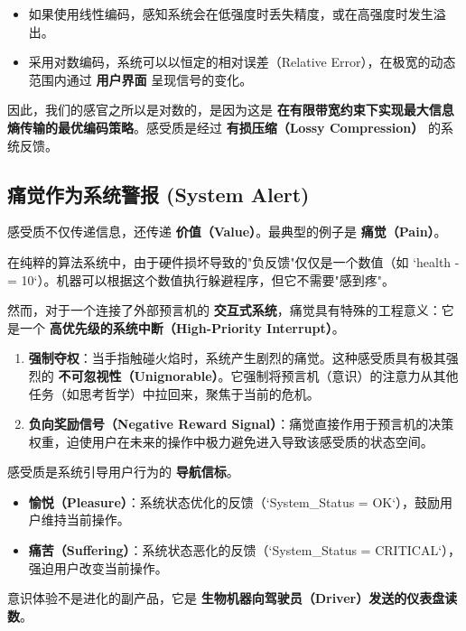 \begin{itemize}
\item 如果使用线性编码，感知系统会在低强度时丢失精度，或在高强度时发生溢出。

\item 采用对数编码，系统可以以恒定的相对误差（Relative Error），在极宽的动态范围内通过 \textbf{用户界面} 呈现信号的变化。
\end{itemize}

因此，我们的感官之所以是对数的，是因为这是 \textbf{在有限带宽约束下实现最大信息熵传输的最优编码策略}。感受质是经过 \textbf{有损压缩（Lossy Compression）} 的系统反馈。

\subsection{痛觉作为系统警报 (System Alert)}

感受质不仅传递信息，还传递 \textbf{价值（Value）}。最典型的例子是 \textbf{痛觉（Pain）}。

在纯粹的算法系统中，由于硬件损坏导致的"负反馈"仅仅是一个数值（如 `health -= 10`）。机器可以根据这个数值执行躲避程序，但它不需要"感到疼"。

然而，对于一个连接了外部预言机的 \textbf{交互式系统}，痛觉具有特殊的工程意义：它是一个 \textbf{高优先级的系统中断（High-Priority Interrupt）}。

\begin{enumerate}
\item \textbf{强制夺权}：当手指触碰火焰时，系统产生剧烈的痛觉。这种感受质具有极其强烈的 \textbf{不可忽视性（Unignorable）}。它强制将预言机（意识）的注意力从其他任务（如思考哲学）中拉回来，聚焦于当前的危机。

\item \textbf{负向奖励信号（Negative Reward Signal）}：痛觉直接作用于预言机的决策权重，迫使用户在未来的操作中极力避免进入导致该感受质的状态空间。
\end{enumerate}

\begin{corollary}[感受质的控制论功能]
感受质是系统引导用户行为的 \textbf{导航信标}。

\begin{itemize}
\item \textbf{愉悦（Pleasure）}：系统状态优化的反馈（`System_Status = OK`），鼓励用户维持当前操作。

\item \textbf{痛苦（Suffering）}：系统状态恶化的反馈（`System_Status = CRITICAL`），强迫用户改变当前操作。
\end{itemize}

意识体验不是进化的副产品，它是 \textbf{生物机器向驾驶员（Driver）发送的仪表盘读数}。
\end{corollary}

